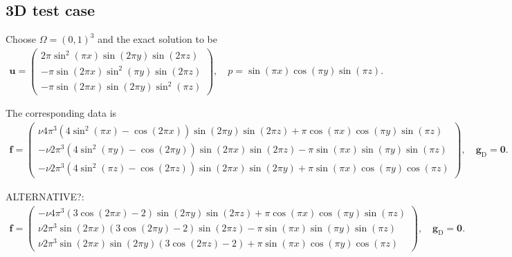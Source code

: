 \documentclass[11pt,a4paper,oneside,onecolumn]{scrartcl}
\newcommand{\ff}{{ \boldsymbol{f} }}
\newcommand{\uu}{{ \boldsymbol{u} }}
\newcommand{\zero}{{ \boldsymbol{0} }}
\newcommand{\gbld}{{ \boldsymbol{g} }}
\newcommand{\Drm}{{ \mathrm{D} }}
\newcommand\rb[1]{{ \left(#1\right) }}
\begin{document}
\subsection{3D test case}	

Choose $\Omega=\rb{0,1}^3$ and the exact solution to be 
\begin{align*}
	\uu = \begin{pmatrix}
		2\pi \sin^2(\pi x) \sin(2 \pi y) \sin(2\pi z) \\
		-\pi \sin(2 \pi x) \sin^2(\pi y) \sin(2\pi z) \\
		-\pi \sin(2 \pi x) \sin(2 \pi y) \sin^2(\pi z)
	\end{pmatrix},
	\quad
	p = \sin(\pi x) \cos(\pi y) \sin(\pi z).
\end{align*}

The corresponding data is 
\begin{align*}
	\ff = \begin{pmatrix}
		\nu 4\pi^3 (4\sin^2(\pi x)-\cos(2\pi x))\sin(2\pi y)\sin(2\pi z) +\pi\cos(\pi x)\cos(\pi y) \sin(\pi z) \\
		-\nu 2\pi^3 (4\sin^2(\pi y)-\cos(2\pi y))\sin(2\pi x)\sin(2\pi z) -\pi\sin(\pi x)\sin(\pi y) \sin(\pi z) \\
		-\nu 2\pi^3 (4\sin^2(\pi z)-\cos(2\pi z))\sin(2\pi x)\sin(2\pi y) +\pi\sin(\pi x)\cos(\pi y)\cos(\pi z)
	\end{pmatrix},
	\quad
	\gbld_\Drm = \zero. 
\end{align*}

ALTERNATIVE?:
\begin{align*}
	\ff = \begin{pmatrix}
		-\nu 4\pi^3 (3\cos(2\pi x)-2)\sin(2\pi y)\sin(2\pi z) 	+\pi\cos(\pi x)\cos(\pi y) \sin(\pi z) \\
		\nu 2\pi^3 \sin(2\pi x)(3\cos(2\pi y)-2)\sin(2\pi z) 	-\pi\sin(\pi x)\sin(\pi y) \sin(\pi z) \\
		\nu 2\pi^3 \sin(2\pi x)\sin(2\pi y)(3\cos(2\pi z)-2) 	+\pi\sin(\pi x)\cos(\pi y)\cos(\pi z)
	\end{pmatrix},
	\quad
	\gbld_\Drm = \zero. 
\end{align*}


\newpage
\end{document}
